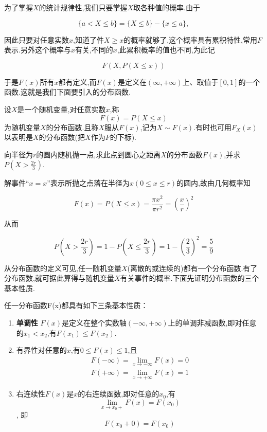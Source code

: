 为了掌握$ X $的统计规律性,我们只要掌握$ X $取各种值的概率.由于

\[
\{a < X \leq b \} = \{ X \leq b\} - \{x\leq a\},
\]

因此只要对任意实数$ x $,知道了件$ X\geq x $的概率就够了,这个概率具有累积特性,常用$ F $表示.另外这个概率与$ x $有关,不同的$ x $,此累积概率的值也不同,为此记

\[
F(X,P(X\leq x))
\]

于是$ F(x) $所有$ x $都有定义,而$ F(x) $是定义在$ (\infty,+\infty ) $上、取值于$ [0,1] $的一个函数.这就是我们下面要引入的分布函数.

\begin{definition}{}{}
	设$ X $是一个随机变量,对任意实数$ x $,称
	\begin{equation} 
	F(x)=P(X \leqslant x) \label{2.1.1}
	\end{equation}
	为随机变量$ X $的分布函数.且称$ X $服从$ F(x) $,记为$ X\sim F(x) $.有时也可用$F_{X}(x)$以表明是$ X $的分布函数(把$ X $作为$ F $的下标).
\end{definition}

\begin{example}
	向半径为$ r $的圆内随机抛一点,求此点到圆心之距离$ X $的分布函数$ F(x) $,并求$P\left(X>\frac{2 r}{3}\right)$.
	
	解事件“$ x=x $”表示所抛之点落在半径为$x(0 \leqslant x \leqslant r)$的圆内,故由几何概率知
	
	\[ 
	F(x)=P(X \leqslant x)=\frac{\pi x^{2}}{\pi r^{2}}=\left(\frac{x}{r}\right)^{2}
	\]
	
	从而
	
	\[ 
	P\left(X>\frac{2 r}{3}\right)=1-P\left(X \leqslant \frac{2 r}{3}\right)=1-\left(\frac{2}{3}\right)^{2}=\frac{5}{9}
	\]
	
	
\end{example}


从分布函数的定义可见,任一随机变量$ X $(离散的或连续的)都有一个分布函数.有了分布函数,就可据此算得与随机变量$ X $有关事件的概率.下面先证明分布函数的三个基本性质.

\begin{theorem}
	任一分布函数F(x)都具有如下三条基本性质：
	\begin{enumerate}
		\item \textbf{单调性} $ F(x) $是定义在整个实数轴$ (-\infty,+\infty ) $上的单调非减函数,即对任意的$ x_1<x_2 $,有$ F(x_1)\leq F(x_2) $.
		\item 有界性对任意的$ x $,有$ 0\leq F(x)\leq 1 $,且
		\[ 
		\begin{array}{l}{F(-\infty)=\lim _{x \rightarrow-\infty} F(x)=0} \\ {F(+\infty)=\lim _{x \rightarrow+\infty} F(x)=1}\end{array}
		\]
		
		\item 右连续性$ F(x) $是$ x $的右连续函数,即对任意的$ x_0 $,有
		\[ 
		\lim _{x \rightarrow x_{0}+} F(x)=F\left(x_{0}\right)
		\],
		即
		\[ 
		F\left(x_{0}+0\right)=F\left(x_{0}\right)
		\]
	\end{enumerate}
\end{theorem}


